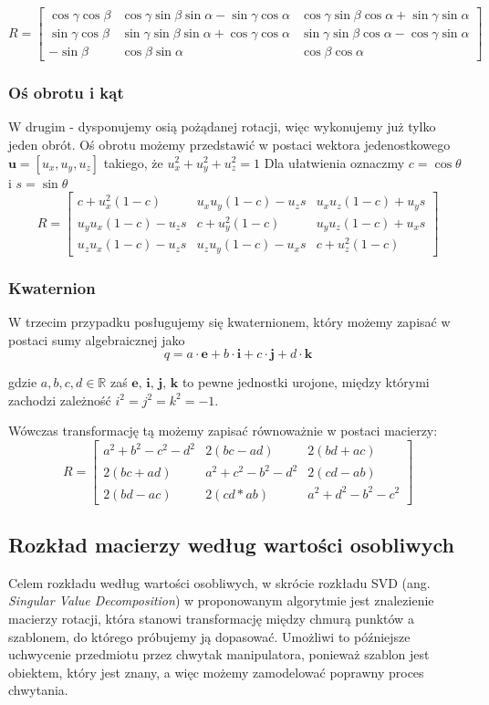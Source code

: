 \documentclass[12pt]{article}
\begin{document}
\[
R = \begin{bmatrix}
\cos \gamma \cos \beta & 
\cos \gamma \sin \beta \sin \alpha - \sin \gamma \cos \alpha &
\cos \gamma \sin \beta \cos \alpha + \sin \gamma \sin \alpha \\
\sin \gamma \cos \beta &
\sin \gamma \sin \beta \sin \alpha + \cos \gamma \cos \alpha &
\sin \gamma \sin \beta \cos \alpha - \cos \gamma \sin \alpha \\
-\sin \beta & \cos \beta \sin \alpha & \cos \beta \cos \alpha
\end{bmatrix}
\]

\subsubsection{Oś obrotu i kąt}
W drugim - dysponujemy osią pożądanej rotacji, więc wykonujemy już tylko jeden obrót. Oś obrotu możemy przedstawić w postaci wektora jedenostkowego $\textbf{u} = [u_{x}, u_{y}, u_{z}]$ takiego, że $u_{x}^2+u_{y}^2+u_{z}^2 = 1$ 
Dla ułatwienia oznaczmy $c = \cos \theta$ i $s = \sin \theta$
\[
R = \begin{bmatrix}
c+u_{x}^2(1-c) & u_{x}u_{y}(1-c)-u_{z}s & u_{x}u_{z}(1-c)+u_{y}s \\
u_{y}u_{x}(1-c)-u_{z}s & c+u_{y}^2(1-c) & u_{y}u_{z}(1-c)+u_{x}s \\
u_{z}u_{x}(1-c)-u_{z}s & u_{z}u_{y}(1-c)-u_{x}s & c+u_{z}^2(1-c)
\end{bmatrix}
\]

\subsubsection{Kwaternion}
W trzecim przypadku posługujemy się kwaternionem, który możemy zapisać w postaci sumy algebraicznej jako
\[q = a \cdot \textbf{e} + b \cdot \textbf{i} + c \cdot \textbf{j} + d \cdot \textbf{k} \]

gdzie $a, b, c, d \in \mathbb{R}$ zaś $\textbf{e, i, j, k}$ to pewne jednostki urojone, między którymi zachodzi zależność $i^2 = j^2 = k^2 = -1$.

Wówczas transformację tą możemy zapisać równoważnie w postaci macierzy:
\[
R = \begin{bmatrix}
a^2+b^2-c^2-d^2 & 2(bc-ad) & 2(bd+ac) \\
2(bc+ad) & a^2+c^2-b^2-d^2 & 2(cd-ab) \\
2(bd-ac) & 2(cd*ab) & a^2+d^2-b^2-c^2
\end{bmatrix}
\]

\newpage
\subsection{Rozkład macierzy według wartości osobliwych}
Celem rozkładu według wartości osobliwych, w skrócie rozkładu SVD (ang. \emph{Singular Value Decomposition}) w proponowanym algorytmie jest znalezienie macierzy rotacji, która stanowi transformację między chmurą punktów a szablonem, do którego próbujemy ją dopasować. Umożliwi to późniejsze uchwycenie przedmiotu przez chwytak manipulatora, ponieważ szablon jest obiektem, który jest znany, a więc możemy zamodelować poprawny proces chwytania.
\end{document}
